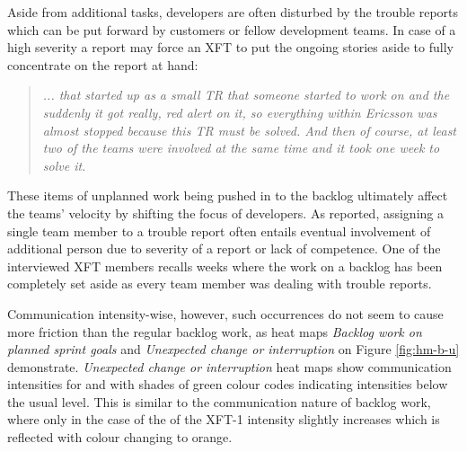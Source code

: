 \begin{description}

   Aside from additional tasks, developers are often disturbed by the trouble reports which can be put forward by customers or fellow development teams. In case of a high severity a report may force an \ac{XFT} to put the ongoing stories aside to fully concentrate on the report at hand:

      \begin{quote}\itshape... that started up as a small TR that someone started to work on and the suddenly it got really, red alert on it, so everything within Ericsson was almost stopped because this TR must be solved. And then of course, at least two of the teams were involved at the same time and it took one week to solve it.
      \end{quote}

   These items of unplanned work being pushed in to the backlog ultimately affect the teams' velocity by shifting the focus of developers. As reported, assigning a single team member to a trouble report often entails eventual involvement of additional person due to severity of a report or lack of competence. One of the interviewed XFT members recalls weeks where the work on a backlog has been completely set aside as every team member was dealing with trouble reports.

      
Communication intensity-wise, however, such occurrences do not seem to cause more friction than the regular backlog work, as heat maps \emph{Backlog work on planned sprint goals} and \emph{Unexpected change or interruption} on Figure \ref{fig:hm-b-u} demonstrate. \emph{Unexpected change or interruption} heat maps show communication intensities for  and  with shades of green colour codes indicating intensities below the usual level. This is similar to the communication nature of backlog work, where only in the case of the  of the XFT-1 intensity slightly increases which is reflected with colour changing to orange.


\end{description}

